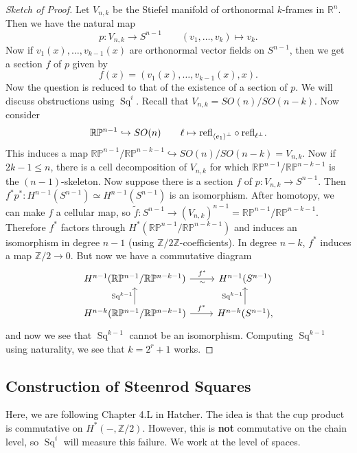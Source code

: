 \documentclass[leqno, openany]{memoir}
\theoremstyle{definition}
\theoremstyle{remark}
\theoremstyle{plain}
\theoremstyle{definition}
\theoremstyle{remark}
\newcommand{\R}{\mathbb{R}}
\newcommand{\Z}{\mathbb{Z}}
\renewcommand{\P}{\mathbb{P}}
\newcommand{\mr}[1]{\mathrm{#1}}
\newcommand{\wt}[1]{\widetilde{#1}}
\DeclareMathOperator{\Sq}{Sq}
\begin{document}
\begin{proof}[Sketch of Proof]
    Let $V_{n,k}$ be the Stiefel manifold of orthonormal $k$-frames in $\R^n$. Then we have the natural map 
    \[ p \colon V_{n,k} \to S^{n-1} \qquad (v_1, \ldots, v_k) \mapsto v_k. \]
    Now if $v_1(x), \ldots, v_{k-1}(x)$ are orthonormal vector fields on $S^{n-1}$, then we get a section $f$ of $p$ given by
    \[ f(x) = (v_1(x), \ldots, v_{k-1}(x), x). \]
    Now the question is reduced to that of the existence of a section of $p$. We will discuss obstructions using $\Sq^i$. Recall that $V_{n,k} = SO(n)/SO(n-k)$. Now consider
    \[ \R\P^{n-1} \hookrightarrow SO(n) \qquad \ell \mapsto \mr{refl}_{\ev{e_1}^{\perp}} \circ \mr{refl}_{\ell^{\perp}}. \]
    This induces a map $\R\P^{n-1}/\R\P^{n-k-1} \hookrightarrow SO(n) / SO(n-k) = V_{n,k}$. Now if $2k-1 \leq n$, there is a cell decomposition of $V_{n,k}$ for which $\R\P^{n-1}/\R\P^{n-k-1}$ is the $(n-1)$-skeleton. Now suppose there is a section $f$ of $p \colon V_{n,k} \to S^{n-1}$. Then $f^* p^* \colon H^{n-1}(S^{n-1}) \simeq H^{n-1}(S^{n-1})$ is an isomorphism. After homotopy, we can make $f$ a cellular map, so $\wt{f} \colon S^{n-1} \to {(V_{n,k})}^{n-1} = \R\P^{n-1}/\R\P^{n-k-1}$. Therefore $f^*$ factors through $H^*(\R\P^{n-1}/\R\P^{n-k-1})$ and induces an isomorphism in degree $n-1$ (using $\Z/2\Z$-coefficients). In degree $n-k$, $f^*$ induces a map $\Z/2 \to 0$. But now we have a commutative diagram
    \begin{equation*}
    \begin{tikzcd}
        H^{n-1}(\R\P^{n-1}/\R\P^{n-k-1}) \arrow{r}{f^*}[swap]{\sim} & H^{n-1}(S^{n-1}) \\
        H^{n-k}(\R\P^{n-1}/\R\P^{n-k-1}) \arrow{r}{f^*} \arrow{u}{\Sq^{k-1}} & H^{n-k}(S^{n-1}) \arrow{u}{\Sq^{k-1}},
    \end{tikzcd}
    \end{equation*}
    and now we see that $\Sq^{k-1}$ cannot be an isomorphism. Computing $\Sq^{k-1}$ using naturality, we see that $k = 2^r + 1$ works.
\end{proof}

\subsection{Construction of Steenrod Squares}%
\label{sub:construction_of_steenrod_squares}

Here, we are following Chapter 4.L in Hatcher. The idea is that the cup product is commutative on $H^*(-, \Z/2)$. However, this is \textbf{not} commutative on the chain level, so $\Sq^i$ will measure this failure. We work at the level of spaces.
\end{document}
